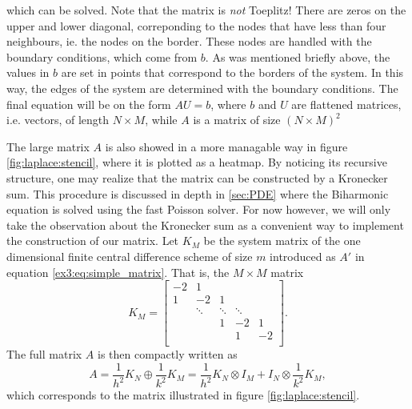 which can be solved.
Note that the matrix is \emph{not} Toeplitz!
There are zeros on the upper and lower diagonal, correponding to the nodes that have less than four neighbours, ie. the nodes on the border.
These nodes are handled with the boundary conditions, which come from $b$. 
As was mentioned briefly above, the values in $b$ are set in points that correspond to the borders of the system.
In this way, the edges of the system are determined with the boundary conditions.
The final equation will be on the form $AU = b$, where $b$ and $U$ are flattened matrices, i.e. vectors, of length $N \times M$, while $A$ is a matrix of size $(N \times M)^2$

The large matrix $A$ is also showed in a more managable way in figure \ref{fig:laplace:stencil}, where it is plotted as a heatmap.
By noticing its recursive structure, one may realize that the matrix can be constructed by a Kronecker sum.
This procedure is discussed in depth in \ref{sec:PDE} where the Biharmonic equation is solved using the fast Poisson solver.
For now however, we will only take the observation about the Kronecker sum as a convenient way to implement the construction of our matrix.
Let $K_M$ be the system matrix of the one dimensional finite central difference scheme of size $m$ introduced as $A'$ in equation \eqref{ex3:eq:simple_matrix}.
That is, the $M\times M$ matrix
$$
K_M =
\begin{bmatrix}
  -2& 1 \\
  1 & -2 & 1 &   \\
  & \ddots & \ddots & \ddots & \\
  &   & 1 & -2 & 1 \\
  &   &  & 1 & -2 \\
\end{bmatrix}.
$$
The full matrix $A$ is then compactly written as
\begin{equation}
  A =
  \frac{1}{h^2} K_N \oplus \frac{1}{k^2} K_M
  = \frac{1}{h^2} K_N \otimes I_M
  + I_N \otimes \frac{1}{k^2} K_M,
\end{equation}
which corresponds to the matrix illustrated in figure \ref{fig:laplace:stencil}.

